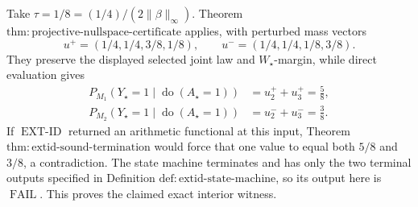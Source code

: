 Take \(\tau=1/8=(1/4)/(2\lVert\beta\rVert_\infty)\).  Theorem \(\mathrm{thm{:}projective\text{-}nullspace\text{-}certificate}\) applies, with perturbed mass vectors
\[
 u^+=(1/4,1/4,3/8,1/8),
 \qquad
 u^-=(1/4,1/4,1/8,3/8).
\]
They preserve the displayed selected joint law and \(W_\star\)-margin, while direct evaluation gives
\[
 \begin{aligned}
 P_{M_1}(Y_\star=1\mid\operatorname{do}(A_\star=1))
 &=u_2^++u_3^+=\frac58,\\
 P_{M_2}(Y_\star=1\mid\operatorname{do}(A_\star=1))
 &=u_2^-+u_3^-=\frac38.
 \end{aligned}
\]
If \(\operatorname{EXT\text{-}ID}\) returned an arithmetic functional at this input, Theorem \(\mathrm{thm{:}extid\text{-}sound\text{-}termination}\) would force that one value to equal both \(5/8\) and \(3/8\), a contradiction.  The state machine terminates and has only the two terminal outputs specified in Definition \(\mathrm{def{:}extid\text{-}state\text{-}machine}\), so its output here is \(\operatorname{FAIL}\).  This proves the claimed exact interior witness.